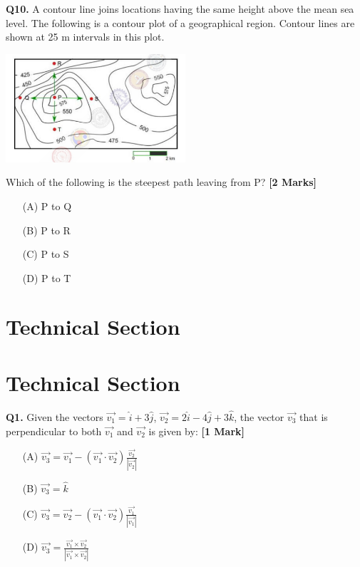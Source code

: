 \documentclass[11pt]{article}
\newcommand{\questiona}[2]{
    \noindent\textbf{Q#2.} #1 \hfill \textbf{[1 Mark]}
}
\newcommand{\questionb}[2]{
    \noindent\textbf{Q#2.} #1 \hfill \textbf{[2 Marks]}
}
\begin{document}
\questionb{A contour line joins locations having the same height above the mean sea level. The following is a contour plot of a geographical region. Contour lines are shown at 25 m intervals in this plot.

\begin{center}
\includegraphics[width=0.5\textwidth]{figures/10.png}
\end{center}

Which of the following is the steepest path leaving from P?}{10}
\begin{enumerate}
    \item[(A)] P to Q
    \item[(B)] P to R
    \item[(C)] P to S
    \item[(D)] P to T
\end{enumerate}

\vspace{0.5cm}

\section*{Technical Section}

\section*{Technical Section}

\questiona{Given the vectors \(\overrightarrow{v_1} = \hat{i} + 3\hat{j}\), \(\overrightarrow{v_2} = 2\hat{i} - 4\hat{j} + 3\hat{k}\), the vector \(\overrightarrow{v_3}\) that is perpendicular to both \(\overrightarrow{v_1}\) and \(\overrightarrow{v_2}\) is given by:}{1}
\begin{enumerate}
    \item[(A)] \(\overrightarrow{v_3} = \overrightarrow{v_1} - (\overrightarrow{v_1} \cdot \overrightarrow{v_2}) \frac{\overrightarrow{v_2}}{|\overrightarrow{v_2}|}\)
    \item[(B)] \(\overrightarrow{v_3} = \hat{k}\)
    \item[(C)] \(\overrightarrow{v_3} = \overrightarrow{v_2} - (\overrightarrow{v_1} \cdot \overrightarrow{v_2}) \frac{\overrightarrow{v_1}}{|\overrightarrow{v_1}|}\)
    \item[(D)] \(\overrightarrow{v_3} = \frac{\overrightarrow{v_1} \times \overrightarrow{v_2}}{|\overrightarrow{v_1} \times \overrightarrow{v_2}|}\)
\end{enumerate}
\end{document}
